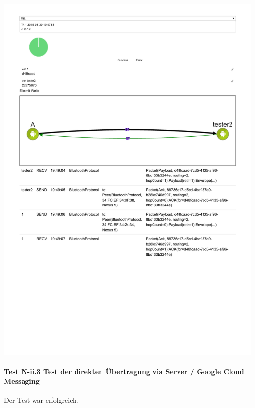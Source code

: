 \includegraphics[trim=0 120 0 0,clip,scale=0.8]{belege/manuelle-tests/netzwerk/Dashboardauszuege/Netzwerktest_II-2b.pdf}
\clearpage

\paragraph{Test N-ii.3 Test der direkten Übertragung via Server / Google Cloud Messaging}

Der Test war erfolgreich.

